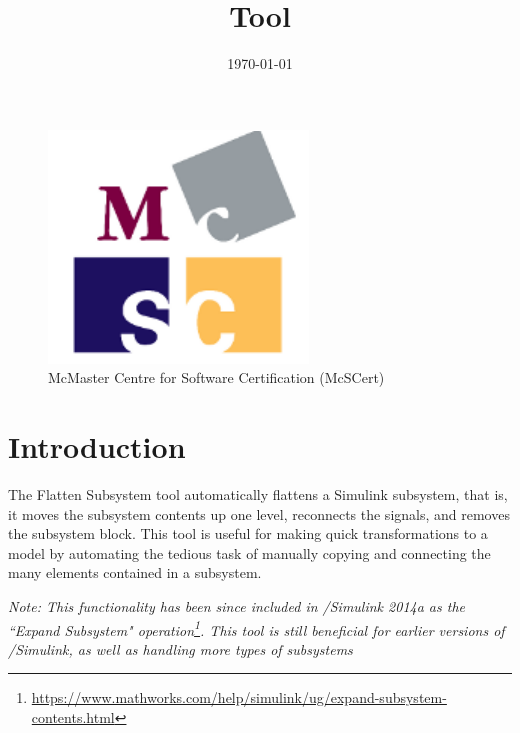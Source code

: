 \documentclass{article}
\title{\ToolName Tool}
\date{\monthyeardate\today}
\makeatletter
\newcommand{\ToolName}{Flatten Subsystem\@\xspace}
\makeatother
\begin{document}
\maketitle
\vfill

\begin{figure}
	\centering
	\includegraphics[]{../figs/McSCert_Logo.pdf} \\
	McMaster Centre for Software Certification (McSCert)
\end{figure}

\newpage

\tableofcontents
\newpage

\section{Introduction}

The \ToolName tool automatically flattens a Simulink subsystem, that is, it moves the subsystem contents up one level, reconnects the signals, and removes the subsystem block. This tool is useful for making quick transformations to a model by automating the tedious task of manually copying and connecting the many elements contained in a subsystem.

\textit{Note: This functionality has been since included in \matlab/Simulink 2014a as the ``Expand Subsystem" operation\footnote{\url{https://www.mathworks.com/help/simulink/ug/expand-subsystem-contents.html}}. This tool is still beneficial for earlier versions of \matlab/Simulink, as well as handling more types of subsystems}
\end{document}
